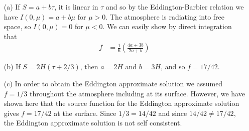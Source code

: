 \newslide

\begin{problem}
\begin{enumerate}
\item[(a)]
If $S=a+b\tau$, it is linear in $\tau$ and so by the Eddington-Barbier relation we have $I(0,\mu) = a + b\mu$ for $\mu > 0$. The atmosphere is radiating into free space, so  $I(0,\mu)=0$ for $\mu < 0$. We can easily show by direct integration that
\begin{align}
f &=\frac{1}{6}\left(\frac{4a+3b}{2a+b}\right)
\end{align}
\item[(b)]
If $S=2H(\tau+2/3)$, then $a=2H$ and $b=3H$, and so $f=17/42$.
\item[(c)]
In order to obtain the Eddington approximate solution we assumed $f=1/3$ throughout the atmosphere including at its surface. However, we have shown here that the source function for the Eddington approximate solution gives $f=17/42$ at the surface. Since $1/3 = 14/42$ and since $14/42 \ne 17/42$, the Eddington approximate solution is not self consistent.
\end{enumerate}
\end{problem}

\newslide


